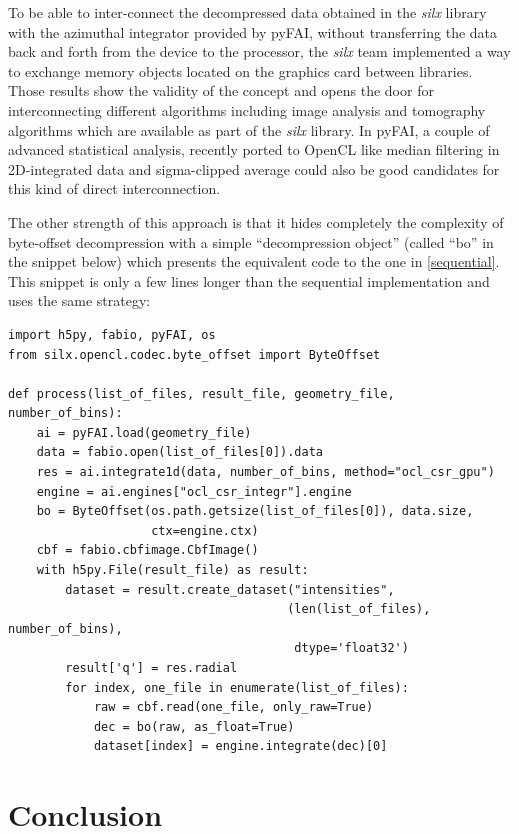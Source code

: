 \documentclass[preprint]{iucr}              %
\begin{document}
To be able to inter-connect the decompressed data obtained in the \textit{silx}
library with the azimuthal integrator provided by pyFAI, without transferring the data
back and forth from the device to the processor, the \textit{silx} team implemented a
way to exchange memory objects located on the graphics card between libraries. 
Those results show the validity of the concept and opens the door for
interconnecting different algorithms including image analysis and
tomography algorithms which are available as part of the \textit{silx} library.
In pyFAI, a couple of advanced statistical analysis, recently ported to
OpenCL like median filtering in 2D-integrated data and sigma-clipped
average could also be good candidates for this kind of direct interconnection.

The other strength of this approach is that it hides completely the
complexity of byte-offset decompression with a simple ``decompression
object'' (called ``bo'' in the snippet below) which presents the equivalent
code to the one in \ref{sequential}.
This snippet is only a few lines longer than the sequential implementation and
uses the same strategy:

\begin{minipage}{\linewidth}
\begin{verbatim}
import h5py, fabio, pyFAI, os
from silx.opencl.codec.byte_offset import ByteOffset

def process(list_of_files, result_file, geometry_file, number_of_bins):
    ai = pyFAI.load(geometry_file)
    data = fabio.open(list_of_files[0]).data
    res = ai.integrate1d(data, number_of_bins, method="ocl_csr_gpu")
    engine = ai.engines["ocl_csr_integr"].engine
    bo = ByteOffset(os.path.getsize(list_of_files[0]), data.size,
                    ctx=engine.ctx) 
    cbf = fabio.cbfimage.CbfImage()
    with h5py.File(result_file) as result:
        dataset = result.create_dataset("intensities", 
                                       (len(list_of_files), number_of_bins),
                                        dtype='float32') 
        result['q'] = res.radial 
        for index, one_file in enumerate(list_of_files):
            raw = cbf.read(one_file, only_raw=True)
            dec = bo(raw, as_float=True)
            dataset[index] = engine.integrate(dec)[0]
\end{verbatim}
\end{minipage}

\section{Conclusion}
\end{document}
